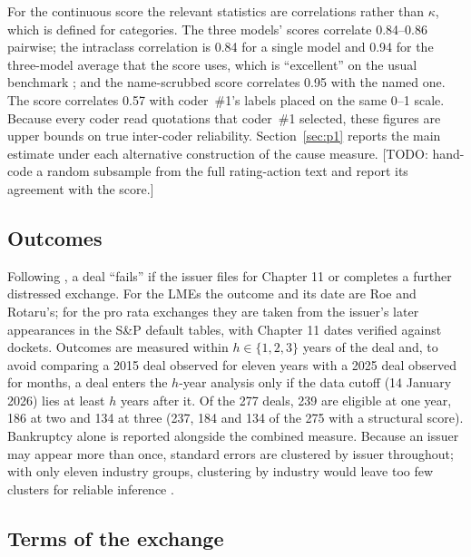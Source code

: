\documentclass[12pt]{article}
\begin{document}
For the continuous score the relevant statistics are correlations rather than $\kappa$, which is defined for categories. The three models' scores correlate 0.84--0.86 pairwise; the intraclass correlation is 0.84 for a single model and 0.94 for the three-model average that the score uses, which is ``excellent'' on the usual benchmark \citep{koo2016}; and the name-scrubbed score correlates 0.95 with the named one. The score correlates 0.57 with coder~\#1's labels placed on the same 0--1 scale. Because every coder read quotations that coder~\#1 selected, these figures are upper bounds on true inter-coder reliability. Section~\ref{sec:p1} reports the main estimate under each alternative construction of the cause measure. [TODO: hand-code a random subsample from the full rating-action text and report its agreement with the score.]

\subsection{Outcomes}

Following \citet{roerotaru2026}, a deal ``fails'' if the issuer files for Chapter 11 or completes a further distressed exchange. For the LMEs the outcome and its date are Roe and Rotaru's; for the pro rata exchanges they are taken from the issuer's later appearances in the S\&P default tables, with Chapter 11 dates verified against dockets. Outcomes are measured within $h \in \{1, 2, 3\}$ years of the deal and, to avoid comparing a 2015 deal observed for eleven years with a 2025 deal observed for months, a deal enters the $h$-year analysis only if the data cutoff (14 January 2026) lies at least $h$ years after it. Of the 277 deals, 239 are eligible at one year, 186 at two and 134 at three (237, 184 and 134 of the 275 with a structural score). Bankruptcy alone is reported alongside the combined measure. Because an issuer may appear more than once, standard errors are clustered by issuer throughout; with only eleven industry groups, clustering by industry would leave too few clusters for reliable inference \citep{cameron2015}.

\subsection{Terms of the exchange}
\end{document}

